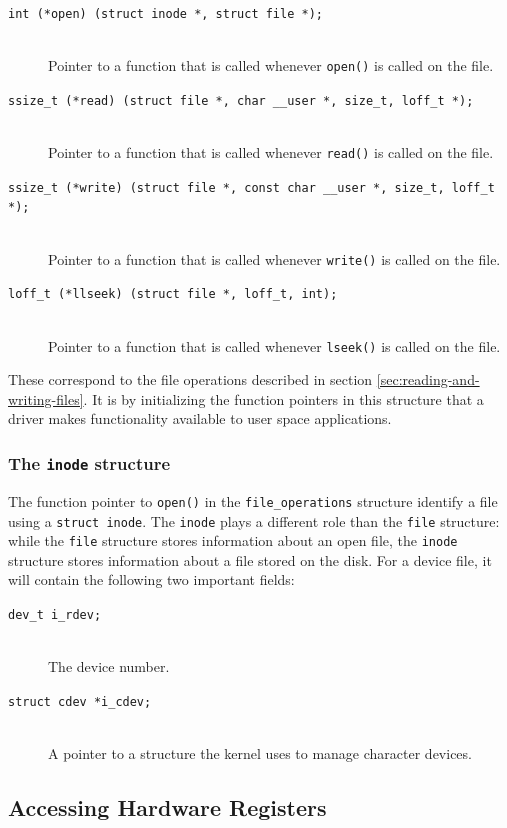 \begin{description}
  \item[\texttt{int (*open) (struct inode *, struct file *);}] \hfill \\
    Pointer to a function that is called whenever \texttt{open()} is called on the file.
  \item[\texttt{ssize\_t (*read) (struct file *, char \_\_user *, size\_t, loff\_t *);}] \hfill \\
    Pointer to a function that is called whenever \texttt{read()} is called on the file.
  \item[\texttt{ssize\_t (*write) (struct file *, const char \_\_user *, size\_t, loff\_t *);}] \hfill \\
    Pointer to a function that is called whenever \texttt{write()} is called on the file.
  \item[\texttt{loff\_t (*llseek) (struct file *, loff\_t, int);}] \hfill \\
    Pointer to a function that is called whenever \texttt{lseek()} is called on the file.
\end{description}
These correspond to the file operations described in section \ref{sec:reading-and-writing-files}. 
It is by initializing the function pointers in this structure that a driver makes functionality available to user space applications.

\subsubsection{The \texttt{inode} structure}
The function pointer to \texttt{open()} in the \texttt{file\_operations} structure identify a file using a \texttt{struct inode}. The \texttt{inode} plays a different role than the \texttt{file} structure: while the \texttt{file} structure stores information about an open file, the \texttt{inode} structure stores information about a file stored on the disk. For a device file, it will contain the following two important fields:
\begin{description}
  \item[\texttt{dev\_t i\_rdev;}] \hfill \\
    The device number.
  \item[\texttt{struct cdev *i\_cdev;}] \hfill \\
    A pointer to a structure the kernel uses to manage character devices.
\end{description}


\subsection{Accessing Hardware Registers}\label{sec:accessing-hardware-registers}


